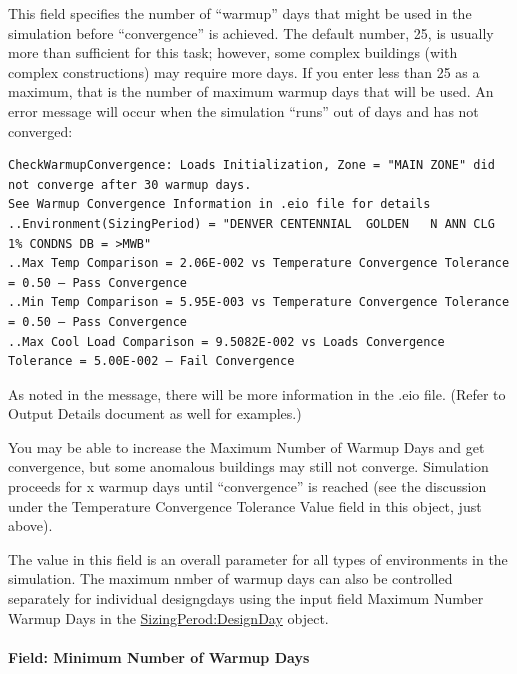This field specifies the number of ``warmup'' days that might be used in the simulation before ``convergence'' is achieved. The default number, 25, is usually more than sufficient for this task; however, some complex buildings (with complex constructions) may require more days. If you enter less than 25 as a maximum, that is the number of maximum warmup days that will be used. An error message will occur when the simulation ``runs'' out of days and has not converged:

\begin{lstlisting}
CheckWarmupConvergence: Loads Initialization, Zone = "MAIN ZONE" did not converge after 30 warmup days.
See Warmup Convergence Information in .eio file for details
..Environment(SizingPeriod) = "DENVER CENTENNIAL  GOLDEN   N ANN CLG 1% CONDNS DB = >MWB"
..Max Temp Comparison = 2.06E-002 vs Temperature Convergence Tolerance = 0.50 – Pass Convergence
..Min Temp Comparison = 5.95E-003 vs Temperature Convergence Tolerance = 0.50 – Pass Convergence
..Max Cool Load Comparison = 9.5082E-002 vs Loads Convergence Tolerance = 5.00E-002 – Fail Convergence
\end{lstlisting}

As noted in the message, there will be more information in the .eio file. (Refer to Output Details document as well for examples.)

You may be able to increase the Maximum Number of Warmup Days and get convergence, but some anomalous buildings may still not converge. Simulation proceeds for x warmup days until ``convergence'' is reached (see the discussion under the Temperature Convergence Tolerance Value field in this object, just above).

The value in this field is an overall parameter for all types of environments in the simulation.  The maximum nmber of warmup days can also be controlled separately for individual designgdays using the input field Maximum Number Warmup Days in the \hyperref[sizingperioddesignday]{SizingPerod:DesignDay} object. 

\paragraph{Field: Minimum Number of Warmup Days}\label{field-minimum-number-of-warmup-days}

